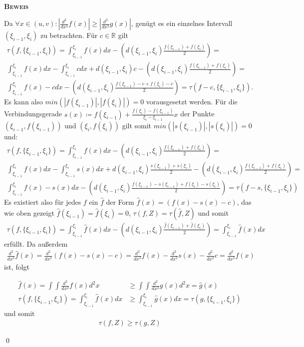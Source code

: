 \documentclass[12pt,a4paper]{scrartcl}
\numberwithin{equation}{section}
\numberwithin{myalgctr}{section}
\numberwithin{mytheoremctr}{subsection}
\numberwithin{mykorollarctr}{subsection}
\numberwithin{mylemmactr}{subsection}
\numberwithin{mybeispielctr}{subsection}
\newenvironment{myproof}{%
	\bigskip\noindent%
	\textsc{\textbf{\\Beweis\\}}%
	\indent
}{\qed\par\bigskip}  %
\begin{document}
	\begin{myproof}
		Da $\forall x\in (u,v): |\frac{d^2}{dx^2}f(x)|\geq |\frac{d^2}{dx^2}g(x)|$, gen\"ugt es ein einzelnes Intervall $(\xi_{i-1},\xi_i)$ zu betrachten. F\"ur $c\in\mathbb{R}$ gilt 
		\begin{gather*}
		\tau(f,\{\xi_{i-1},\xi_i\}) = \int_{\xi_{i-1}}^{\xi_i}f(x)dx - \left(d(\xi_{i-1},\xi_i)\frac{f(\xi_{i-1})+f(\xi_i)}{2}\right) =\\
		\int_{\xi_{i-1}}^{\xi_i}f(x)dx - \int_{\xi_{i-1}}^{\xi_i}cdx + d(\xi_{i-1},\xi_i)c - \left(d(\xi_{i-1},\xi_i)\frac{f(\xi_{i-1})+f(\xi_i)}{2}\right) = \\
		\int_{\xi_{i-1}}^{\xi_i}f(x) - cdx  - \left(d(\xi_{i-1},\xi_i)\frac{f(\xi_{i-1})-c+f(\xi_i)-c}{2}\right) = \tau(f-c,\{\xi_{i-1},\xi_i\}).
		\end{gather*}
		Es kann also $min(|f(\xi_{i-1})|,|f(\xi_{i})|) = 0$ vorausgesetzt werden. F\"ur die Verbindungsgerade $s(x)\coloneqq f(\xi_{i-1}) + \frac{f(\xi_{i}) - f(\xi_{i-1})}{\xi_{i} - \xi_{i-1}}x$ der Punkte $(\xi_{i-1},f(\xi_{i-1}))$ und $(\xi_{i},f(\xi_{i}))$ gilt somit $min(|s(\xi_{i-1})|, |s(\xi_{i})|) = 0$ und:
		\begin{gather*}
		\tau(f,\{\xi_{i-1},\xi_i\}) =\int_{\xi_{i-1}}^{\xi_i}f(x)dx - \left(d(\xi_{i-1},\xi_i)\frac{f(\xi_{i-1})+f(\xi_i)}{2}\right) =\\
		\int_{\xi_{i-1}}^{\xi_i}f(x)dx - \int_{\xi_{i-1}}^{\xi_i}s(x)dx + d(\xi_{i-1},\xi_i)\frac{s(\xi_{i-1})+s(\xi_i)}{2} - \left(d(\xi_{i-1},\xi_i)\frac{f(\xi_{i-1})+f(\xi_i)}{2}\right) = \\
		\int_{\xi_{i-1}}^{\xi_i}f(x) - s(x)dx  - \left(d(\xi_{i-1},\xi_i)\frac{f(\xi_{i-1})-s(\xi_{i-1})+f(\xi_i)-s(\xi_i)}{2}\right) = \tau(f-s,\{\xi_{i-1},\xi_i\})
		\end{gather*} 
		Es existiert also f\"ur jedes $f$  ein  $\hat{f}$ der Form $\hat{f}(x)=(f(x) - s(x) - c)$, das wie oben gezeigt $\hat{f}(\xi_{i-1}) = \hat{f}(\xi_{i}) = 0$, $\tau(f,Z) = \tau(\hat{f},Z)$ und somit
		\begin{align*}
			\tau(f,\{\xi_{i-1},\xi_i\}) = \int_{\xi_{i-1}}^{\xi_i}\hat{f}(x)dx - \left(d(\xi_{i-1},\xi_i)\frac{\hat{f}(\xi_{i-1})+\hat{f}(\xi_i)}{2}\right) = \int_{\xi_{i-1}}^{\xi_i}\hat{f}(x)dx
		\end{align*}
		erf\"ullt. Da au\ss erdem 
		\begin{align*}
		\frac{d^2}{dx^2}\hat{f}(x) = \frac{d^2}{dx^2} (f(x) - s(x) - c) = \frac{d^2}{dx^2}f(x) - \frac{d^2}{dx^2}s(x) - \frac{d^2}{dx^2}c= \frac{d^2}{dx^2}f(x)
		\end{align*}
		ist, folgt
		
		
		\begin{align*}
		\hat{f}(x)  = \int\int \frac{d^2}{dx^2}f(x)d^2x &\geq \int\int \frac{d^2}{dx^2}g(x)d^2x = \hat{g}(x)\\
		\tau(f,\{\xi_{i-1},\xi_i\}) = \int_{\xi_{i-1}}^{\xi_{i}}\hat{f}(x)dx&\geq \int_{\xi_{i-1}}^{\xi_{i}}\hat{g}(x)dx = \tau(g,\{\xi_{i-1},\xi_i\})
		\end{align*}
		und somit
		\begin{align*}
		\tau(f,Z)\geq\tau(g,Z)
		\end{align*}
		
	\end{myproof}
\end{document}
